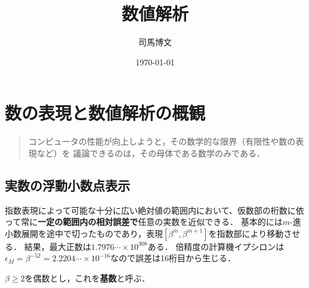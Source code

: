 \documentclass[uplatex, dvipdfmx]{jsreport}
\title{数値解析}
\author{司馬博文}
\date{\today}
\begin{document}
\tableofcontents

\chapter{数の表現と数値解析の概観}

\begin{quotation}
    コンピュータの性能が向上しようと，その数学的な限界（有限性や数の表現など）を
    議論できるのは，その母体である数学のみである．
\end{quotation}

\section{実数の浮動小数点表示}

\begin{tcolorbox}[colframe=ForestGreen, colback=ForestGreen!10!white,breakable,colbacktitle=ForestGreen!40!white,coltitle=black,fonttitle=\bfseries\sffamily,
title=]
    指数表現によって可能な十分に広い絶対値の範囲内において、仮数部の桁数に依って常に\textbf{一定の範囲内の相対誤差で}任意の実数を近似できる．
    基本的には$m$-進小数展開を途中で切ったものであり，表現$[\beta^m,\beta^{m+1}]$を指数部により移動させる．
    結果，最大正数は$1.7976\cdots\times 10^{308}$ある．
    倍精度の計算機イプシロンは$\epsilon_M=\beta^{-52}=2.2204\cdots\times 10^{-16}$なので誤差は16桁目から生じる．
\end{tcolorbox}

\begin{notation}
    $\beta\ge 2$を偶数とし，これを\textbf{基数}と呼ぶ．
\end{notation}
\end{document}
